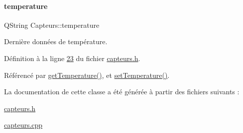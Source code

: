 \mbox{\label{class_capteurs_acf6f97c1e121ae0f53c9a56430d42dfe}} 
\paragraph{\texorpdfstring{temperature}{temperature}}
{\footnotesize\ttfamily Q\+String Capteurs\+::temperature\hspace{0.3cm}{\ttfamily [private]}}



Dernière données de température. 



Définition à la ligne \hyperlink{capteurs_8h_source_l00023}{23} du fichier \hyperlink{capteurs_8h_source}{capteurs.\+h}.



Référencé par \hyperlink{capteurs_8cpp_source_l00044}{get\+Temperature()}, et \hyperlink{capteurs_8cpp_source_l00024}{set\+Temperature()}.



La documentation de cette classe a été générée à partir des fichiers suivants \+:\begin{DoxyCompactItemize}
\item 
\hyperlink{capteurs_8h}{capteurs.\+h}\item 
\hyperlink{capteurs_8cpp}{capteurs.\+cpp}\end{DoxyCompactItemize}
